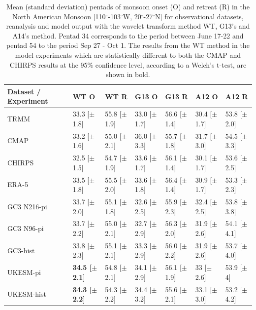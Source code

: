 \begin{table}[b!]
\caption{Mean (standard deviation) pentads of monsoon onset (O) and retreat (R) in the North American Monsoon [110$^\circ$-103$^\circ$W, 20$^\circ$-27$^\circ$N] for observational datasets, reanalysis and model output with the wavelet transform method WT, G13's and A14's method. Pentad 34 corresponds to the period between June 17-22 and pentad 54 to the period Sep 27 - Oct 1. The results from the WT method in the model experiments which are statistically different to both the CMAP and CHIRPS results at the 95\% confidence level, according to a Welch's t-test, are shown in bold. }
\label{tab:3}       %
\begin{tabular}{p{2.2cm}p{1.765cm}p{1.765cm}p{1.765cm}p{1.765cm}p{1.7655cm}p{1.7655cm}}
\hline\noalign{\smallskip} \small
Dataset / Experiment & WT O 	& WT R 	& G13 O & G13 R & A12 O & A12 R \\ \hline
TRMM & 33.3 [$\pm$1.8] & 55.8 [$\pm$1.9] & 33.0 [$\pm$1.7] & 56.6 [$\pm$1.4] & 30.4 [$\pm$1.7] & 53.8 [$\pm$2.0]  \\
CMAP & 33.2 [$\pm$1.6] & 55.0 [$\pm$2.1] & 36.0 [$\pm$3.3] & 55.7 [$\pm$1.8] & 31.7 [$\pm$3.0] & 54.5 [$\pm$3.3]   \\
CHIRPS & 32.5 [$\pm$1.5] & 54.7 [$\pm$1.9] & 33.6 [$\pm$1.7]& 56.1 [$\pm$1.4] & 30.1 [$\pm$1.7] & 53.6 [$\pm$2.5]   \\
ERA-5 & 33.5 [$\pm$1.8] & 55.5 [$\pm$2.0] & 33.6 [$\pm$1.8]& 56.4 [$\pm$1.4] & 30.9 [$\pm$1.7] & 53.3 [$\pm$2.3]   \\
GC3 N216-pi  & 33.7 [$\pm$2.0] & 55.1 [$\pm$1.8]& 32.6 [$\pm$2.5] & 55.9 [$\pm$2.3] & 32.4 [$\pm$2.5] &53.8 [$\pm$3.8]  \\
GC3 N96-pi & 33.7 [$\pm$2.2] & 55.0 [$\pm$2.1] & 32.7 [$\pm$2.9] & 56.3 [$\pm$2.0] & 31.9 [$\pm$2.6] & 54.1 [$\pm$4.1]  \\
GC3-hist & 33.8 [$\pm$2.3] & 55.1 [$\pm$2.1]& 33.3 [$\pm$2.9] & 56.0 [$\pm$2.2] & 31.9 [$\pm$2.6] & 53.7 [$\pm$4.0]  \\
UKESM-pi & \bf{34.5} [$\pm$2.1] & 54.8 [$\pm$2.1] & 34.1 [$\pm$2.9] & 56.1 [$\pm$1.9] & 33 [$\pm$2.6] & 53.9 [$\pm$4]   \\
UKESM-hist & \bf{34.3} [$\pm$2.2] & 54.3 [$\pm$2.2]& 34.4 [$\pm$3.2] & 55.6 [$\pm$2.1] & 33.1 [$\pm$3.0] & 53.2 [$\pm$4.2] \\
\end{tabular}
\end{table}


